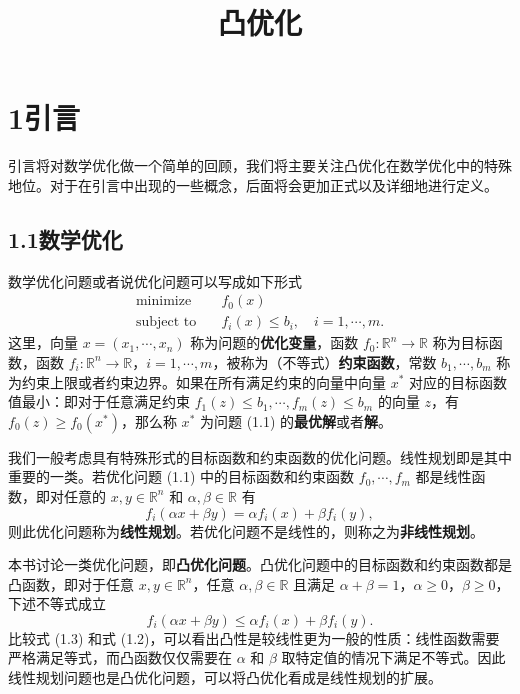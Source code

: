 \documentclass[UTF8, 12pt, fontset=fandol, oneside]{ctexart}
\title{凸优化}
\author{}
\date{}
\begin{document}
\maketitle

\section*{1\quad 引言}

引言将对数学优化做一个简单的回顾，我们将主要关注凸优化在数学优化中的特殊地位。对于在引言中出现的一些概念，后面将会更加正式以及详细地进行定义。

\subsection*{1.1\quad 数学优化}

数学优化问题或者说优化问题可以写成如下形式
\begin{equation}
\begin{aligned}
  \text{minimize}\quad & f_0(x)\\
  \text{subject to}\quad & f_i(x)\le b_i,\quad i=1,\cdots,m.
\end{aligned}
\tag{1.1}
\end{equation}
这里，向量 $x=(x_1,\cdots,x_n)$ 称为问题的\textbf{优化变量}，函数 $f_0:\mathbb{R}^n\to\mathbb{R}$ 称为目标函数，函数 $f_i:\mathbb{R}^n\to\mathbb{R}$，$i=1,\cdots,m$，被称为（不等式）\textbf{约束函数}，常数 $b_1,\cdots,b_m$ 称为约束上限或者约束边界。如果在所有满足约束的向量中向量 $x^*$ 对应的目标函数值最小：即对于任意满足约束 $f_1(z)\le b_1,\cdots,f_m(z)\le b_m$ 的向量 $z$，有 $f_0(z)\ge f_0(x^*)$，那么称 $x^*$ 为问题 (1.1) 的\textbf{最优解}或者\textbf{解}。

我们一般考虑具有特殊形式的目标函数和约束函数的优化问题。线性规划即是其中重要的一类。若优化问题 (1.1) 中的目标函数和约束函数 $f_0,\cdots,f_m$ 都是线性函数，即对任意的 $x,y\in\mathbb{R}^n$ 和 $\alpha,\beta\in\mathbb{R}$ 有
\begin{equation}
  f_i(\alpha x+\beta y)=\alpha f_i(x)+\beta f_i(y),
\tag{1.2}
\end{equation}
则此优化问题称为\textbf{线性规划}。若优化问题不是线性的，则称之为\textbf{非线性规划}。

本书讨论一类优化问题，即\textbf{凸优化问题}。凸优化问题中的目标函数和约束函数都是凸函数，即对于任意 $x,y\in\mathbb{R}^n$，任意 $\alpha,\beta\in\mathbb{R}$ 且满足 $\alpha+\beta=1$，$\alpha\ge0$，$\beta\ge0$，下述不等式成立
\begin{equation}
  f_i(\alpha x+\beta y)\le \alpha f_i(x)+\beta f_i(y).
\tag{1.3}
\end{equation}
比较式 (1.3) 和式 (1.2)，可以看出凸性是较线性更为一般的性质：线性函数需要严格满足等式，而凸函数仅仅需要在 $\alpha$ 和 $\beta$ 取特定值的情况下满足不等式。因此线性规划问题也是凸优化问题，可以将凸优化看成是线性规划的扩展。
\end{document}
